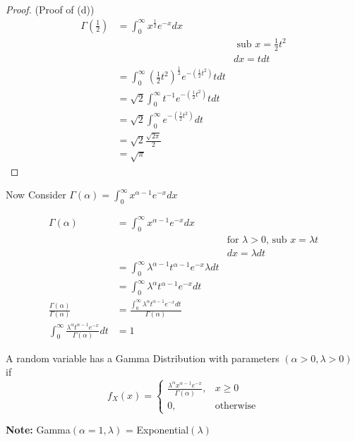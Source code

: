 \documentclass[12pt, twoside]{article}
\begin{document}
\begin{enumerate}
{	\begin{proof}
		(Proof of (d))\\
		\begin{align*}
			\Gamma (\frac{1}{2}) &= \int^\infty_0 x^{\frac{1}{2}} e^{-x} dx\\
			&& \text{ sub } x = \frac{1}{2}t^2\\
			&& dx = t dt\\
			&= \int^\infty_0 (\frac{1}{2}t^2)^{\frac{1}{2}} e^{-(\frac{1}{2}t^2)} t dt\\
			&= \sqrt{2} \int^\infty_0 t^{-1} e^{-(\frac{1}{2}t^2)} t dt\\
			&= \sqrt{2} \int^\infty_0 e^{-(\frac{1}{2}t^2)} dt\\
			&= \sqrt{2} \frac{\sqrt{2\pi}}{2}\\
			&= \sqrt{\pi}
		\end{align*}

	\end{proof}
	
	Now Consider $\Gamma (\alpha) = \int^\infty_0 x^{\alpha - 1} e^{-x} dx$

	\begin{align*}
		\Gamma (\alpha) &= \int^\infty_0 x^{\alpha - 1} e^{-x} dx\\
		&& \text{for $\lambda > 0$, sub } x = \lambda t\\
		&& dx = \lambda dt\\
		&= \int^\infty_0 \lambda^{\alpha - 1} t^{\alpha - 1} e^{-x} \lambda dt\\
		&= \int^\infty_0 \lambda^{\alpha} t^{\alpha - 1} e^{-x} dt\\
		\frac{\Gamma (\alpha)}{\Gamma (\alpha)} &= \frac{\int^\infty_0 \lambda^{\alpha} t^{\alpha - 1} e^{-x} dt}{\Gamma (\alpha)}\\
		\int^\infty_0 \frac{\lambda^{\alpha} t^{\alpha - 1} e^{-x}}{\Gamma (\alpha)} dt &= 1
	\end{align*}
	
	\begin{tcolorbox}[title=Definition: Gamma Distribution]
		A random variable has a Gamma Distribution with parameters $(\alpha > 0, \lambda > 0)$ if
		$$f_X (x) = 
		\begin{cases}
		\frac{\lambda^{\alpha} x^{\alpha - 1} e^{-x}}{\Gamma (\alpha)}, & x \geq 0\\
		0, & \text{otherwise}
		\end{cases}
$$
	\end{tcolorbox}

	\textbf{Note:} Gamma$(\alpha = 1, \lambda)$ = Exponential$(\lambda)$
	
}
\end{enumerate}
\end{document}
